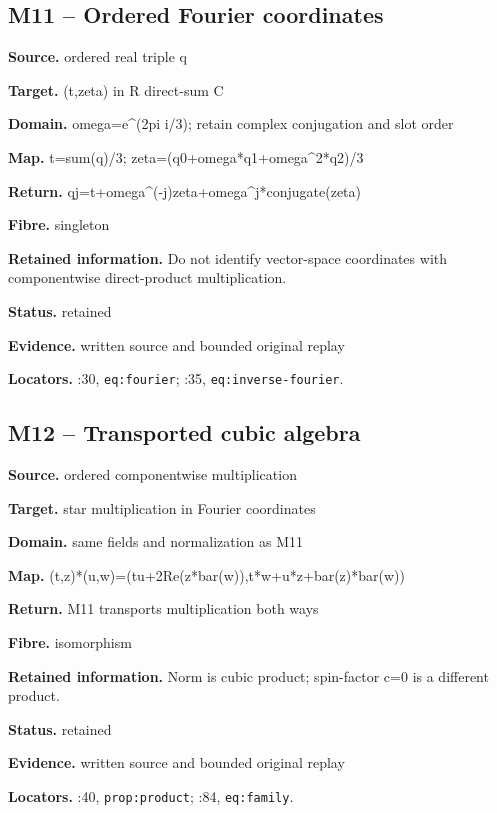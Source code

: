 \subsection*{M11 -- Ordered Fourier coordinates}
\noindent\textbf{Source.} ordered real triple q\par
\noindent\textbf{Target.} (t,zeta) in R direct-sum C\par
\noindent\textbf{Domain.} omega=e\textasciicircum{}(2pi i/3); retain complex conjugation and slot order\par
\noindent\textbf{Map.} t=sum(q)/3; zeta=(q0+omega*q1+omega\textasciicircum{}2*q2)/3\par
\noindent\textbf{Return.} qj=t+omega\textasciicircum{}(-j)zeta+omega\textasciicircum{}j*conjugate(zeta)\par
\noindent\textbf{Fibre.} singleton\par
\noindent\textbf{Retained information.} Do not identify vector-space coordinates with componentwise direct-product multiplication.\par
\noindent\textbf{Status.} retained\par
\noindent\textbf{Evidence.} written source and bounded original replay\par
\noindent\textbf{Locators.} :30, \texttt{eq:fourier}; :35, \texttt{eq:inverse-fourier}.
\subsection*{M12 -- Transported cubic algebra}
\noindent\textbf{Source.} ordered componentwise multiplication\par
\noindent\textbf{Target.} star multiplication in Fourier coordinates\par
\noindent\textbf{Domain.} same fields and normalization as M11\par
\noindent\textbf{Map.} (t,z)*(u,w)=(tu+2Re(z*bar(w)),t*w+u*z+bar(z)*bar(w))\par
\noindent\textbf{Return.} M11 transports multiplication both ways\par
\noindent\textbf{Fibre.} isomorphism\par
\noindent\textbf{Retained information.} Norm is cubic product; spin-factor c=0 is a different product.\par
\noindent\textbf{Status.} retained\par
\noindent\textbf{Evidence.} written source and bounded original replay\par
\noindent\textbf{Locators.} :40, \texttt{prop:product}; :84, \texttt{eq:family}.
